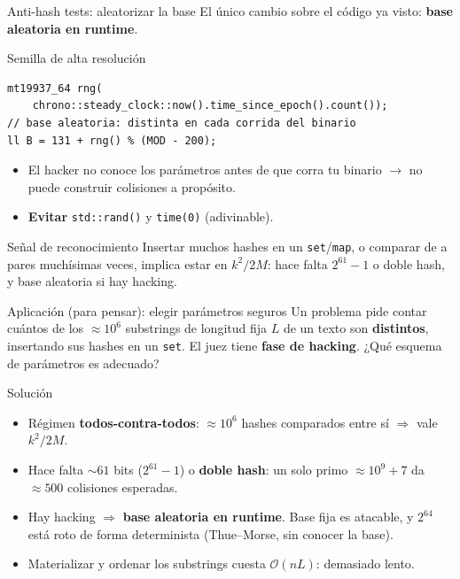 \documentclass{beamer}
\begin{document}
\begin{frame}[fragile]{Anti-hash tests: aleatorizar la base}
El único cambio sobre el código ya visto: \textbf{base aleatoria en runtime}.
\begin{exampleblock}{Semilla de alta resolución}
\begin{verbatim}
mt19937_64 rng(
    chrono::steady_clock::now().time_since_epoch().count());
// base aleatoria: distinta en cada corrida del binario
ll B = 131 + rng() % (MOD - 200);
\end{verbatim}
\end{exampleblock}
\begin{itemize}
    \item El hacker no conoce los parámetros antes de que corra tu binario $\to$ no puede construir colisiones a propósito.
    \item \textbf{Evitar} \texttt{std::rand()} y \texttt{time(0)} (adivinable).
\end{itemize}
\begin{block}{Señal de reconocimiento}
Insertar muchos hashes en un \texttt{set}/\texttt{map}, o comparar de a pares muchísimas veces, implica estar en $k^2/2M$: hace falta $2^{61}{-}1$ o doble hash, y base aleatoria si hay hacking.
\end{block}
\end{frame}

\begin{frame}{Aplicación (para pensar): elegir parámetros seguros}
Un problema pide contar cuántos de los $\approx 10^6$ substrings de longitud fija $L$ de un texto son \textbf{distintos}, insertando sus hashes en un \texttt{set}. El juez tiene \textbf{fase de hacking}. ¿Qué esquema de parámetros es adecuado?
\pause
\begin{block}{Solución}
\footnotesize
\begin{itemize}
    \item Régimen \textbf{todos-contra-todos}: $\approx 10^6$ hashes comparados entre sí $\Rightarrow$ vale $k^2/2M$.
    \item Hace falta $\sim 61$ bits ($2^{61}{-}1$) o \textbf{doble hash}: un solo primo $\approx 10^9{+}7$ da $\approx 500$ colisiones esperadas.
    \item Hay hacking $\Rightarrow$ \textbf{base aleatoria en runtime}. Base fija es atacable, y $2^{64}$ está roto de forma determinista (Thue--Morse, sin conocer la base).
    \item Materializar y ordenar los substrings cuesta $\mathcal{O}(nL)$: demasiado lento.
\end{itemize}
\end{block}
\end{frame}
\end{document}
